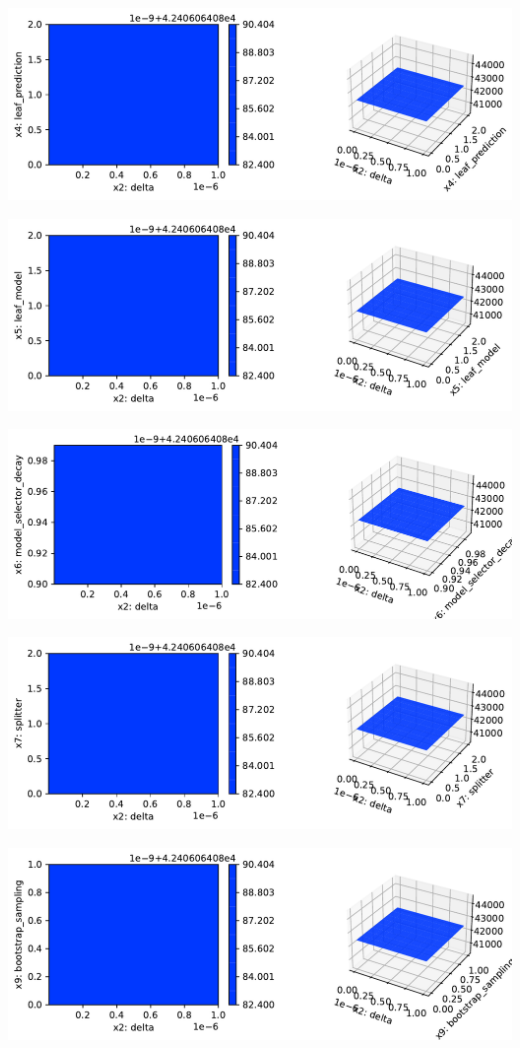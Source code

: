 \documentclass[
  letterpaper,
  DIV=11,
  numbers=noendperiod]{scrreprt}
\begin{document}
\includegraphics{024_spot_hpt_river_friedman_hatr_files/figure-pdf/cell-42-output-30.pdf}

\includegraphics{024_spot_hpt_river_friedman_hatr_files/figure-pdf/cell-42-output-31.pdf}

\includegraphics{024_spot_hpt_river_friedman_hatr_files/figure-pdf/cell-42-output-32.pdf}

\includegraphics{024_spot_hpt_river_friedman_hatr_files/figure-pdf/cell-42-output-33.pdf}

\includegraphics{024_spot_hpt_river_friedman_hatr_files/figure-pdf/cell-42-output-34.pdf}
\end{document}
